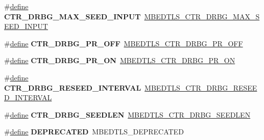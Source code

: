 \begin{DoxyCompactItemize}
\item 
\mbox{\label{compat-1_83_8h_aeeb6d3716faa516c3b90d6587de119dc}} 
\#\hyperlink{structdefine}{define} {\bfseries C\+T\+R\+\_\+\+D\+R\+B\+G\+\_\+\+M\+A\+X\+\_\+\+S\+E\+E\+D\+\_\+\+I\+N\+P\+UT}~\hyperlink{ctr__drbg_8h_a1b944a1ceb01e5749008fbf27a6706e4}{M\+B\+E\+D\+T\+L\+S\+\_\+\+C\+T\+R\+\_\+\+D\+R\+B\+G\+\_\+\+M\+A\+X\+\_\+\+S\+E\+E\+D\+\_\+\+I\+N\+P\+UT}
\item 
\mbox{\label{compat-1_83_8h_ad15c071c711a60200f5dcbbcb191c9eb}} 
\#\hyperlink{structdefine}{define} {\bfseries C\+T\+R\+\_\+\+D\+R\+B\+G\+\_\+\+P\+R\+\_\+\+O\+FF}~\hyperlink{ctr__drbg_8h_a9651ed4c66749bb7f232b93681593834}{M\+B\+E\+D\+T\+L\+S\+\_\+\+C\+T\+R\+\_\+\+D\+R\+B\+G\+\_\+\+P\+R\+\_\+\+O\+FF}
\item 
\mbox{\label{compat-1_83_8h_ac689b93ae32164241a48cee742a8fc74}} 
\#\hyperlink{structdefine}{define} {\bfseries C\+T\+R\+\_\+\+D\+R\+B\+G\+\_\+\+P\+R\+\_\+\+ON}~\hyperlink{ctr__drbg_8h_ae534608231e768e8cf4010e1aa74dba8}{M\+B\+E\+D\+T\+L\+S\+\_\+\+C\+T\+R\+\_\+\+D\+R\+B\+G\+\_\+\+P\+R\+\_\+\+ON}
\item 
\mbox{\label{compat-1_83_8h_aada2905e3923ac30ff08869396fa715a}} 
\#\hyperlink{structdefine}{define} {\bfseries C\+T\+R\+\_\+\+D\+R\+B\+G\+\_\+\+R\+E\+S\+E\+E\+D\+\_\+\+I\+N\+T\+E\+R\+V\+AL}~\hyperlink{ctr__drbg_8h_af48f34760ba188dfc8e851c66e891c19}{M\+B\+E\+D\+T\+L\+S\+\_\+\+C\+T\+R\+\_\+\+D\+R\+B\+G\+\_\+\+R\+E\+S\+E\+E\+D\+\_\+\+I\+N\+T\+E\+R\+V\+AL}
\item 
\mbox{\label{compat-1_83_8h_ab2109628bba8f8548bf5f0d18bf18cd8}} 
\#\hyperlink{structdefine}{define} {\bfseries C\+T\+R\+\_\+\+D\+R\+B\+G\+\_\+\+S\+E\+E\+D\+L\+EN}~\hyperlink{ctr__drbg_8h_a8e6ac8e75c3becda32d9bc7b8ac2c23a}{M\+B\+E\+D\+T\+L\+S\+\_\+\+C\+T\+R\+\_\+\+D\+R\+B\+G\+\_\+\+S\+E\+E\+D\+L\+EN}
\item 
\mbox{\label{compat-1_83_8h_ac1e8a42306d8e67cb94ca31c3956ee78}} 
\#\hyperlink{structdefine}{define} {\bfseries D\+E\+P\+R\+E\+C\+A\+T\+ED}~M\+B\+E\+D\+T\+L\+S\+\_\+\+D\+E\+P\+R\+E\+C\+A\+T\+ED
\item 
\mbox{\label{compat-1_83_8h_a7ca3b464dc9e6cabf82f636101b6e133}} 

\end{DoxyCompactItemize}
